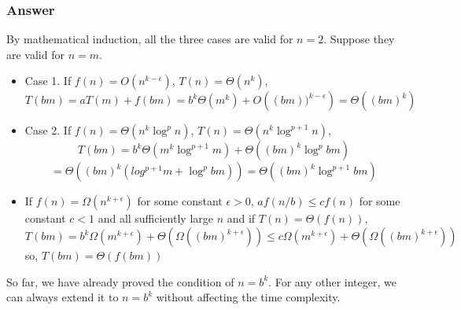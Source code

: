 \documentclass[a4paper]{article}
\begin{document}
\subsubsection*{Answer}
By mathematical induction, all the three cases are valid for $n=2$. Suppose they are valid for $n = m$.
\begin{itemize}
	\item Case 1. If $f(n)=O\left(n^{k-\epsilon}\right)$, $T(n)=\Theta\left(n^{k}\right)$,
	      $$T(bm)=a T\left(m\right)+f(bm)=b^k\Theta\left(m^{k}\right)+O\left((bm))^{k-\epsilon}\right)=\Theta\left((bm)^{k}\right)$$
	\item Case 2. If $f(n)=\Theta\left(n^{k} \log ^{p} n\right)$, $T(n)=\Theta\left(n^{k} \log ^{p+1} n\right)$,
	      $$
		      T(bm)=b^k\Theta\left(m^{k} \log ^{p+1} m\right)+\Theta\left((bm)^{k} \log ^{p} bm\right)
	      $$
	      $$
		      =\Theta\left((bm)^{k} (log^{p+1}m + \log ^{p} bm)\right)=\Theta\left((bm)^{k} \log ^{p+1} bm\right)
	      $$
	\item If $f(n)=\Omega\left(n^{k+\epsilon}\right)$ for some constant $\epsilon>0$, $a f(n / b) \leq c f(n)$ for some constant $c<1$ and all sufficiently large $n$ and if $T(n)=\Theta(f(n))$,
	      $$
		      T(bm)=b^k\Omega\left(m^{k+\epsilon}\right)+\Theta(\Omega\left((bm)^{k+\epsilon}\right)) \leq c\Omega\left(m^{k+\epsilon}\right) + \Theta(\Omega\left((bm)^{k+\epsilon}\right))
	      $$
	      so, $T(bm) = \Theta(f(bm))$
\end{itemize}

So far, we have already proved the condition of $n=b^k$. For any other integer, we can always extend it to $n=b^k$ without affecting the time complexity.
\vspace{2cm}
\end{document}
